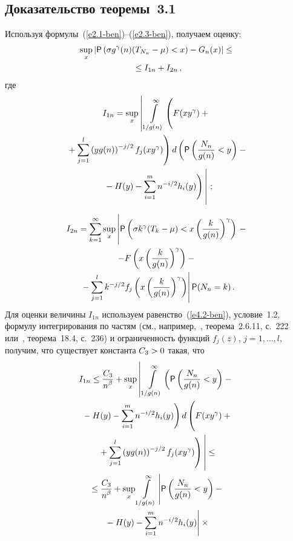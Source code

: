 \begin{multicols}{2}
\section{Доказательство теоремы~3.1}

Используя формулы~(\ref{e2.1-ben})--(\ref{e2.3-ben}),  получаем оценку:
\begin{multline}
\sup\limits_{x}\left| {\sf P}\left(\sigma g^\gamma(n)(T_{N_n}  -  \mu)  <
x\right) -  G_n(x)\right| \leq {}\\
{}\leq I_{1n} + I_{2n}\,, \label{e4.1-ben}
\end{multline}
где
\begin{multline}
I_{1n} =
 \sup\limits_{x}\left| \, \int\limits_{1/g(n)}^\infty \left(
 \vphantom{\sum\limits_{j=1}^l}
 F(x y^\gamma) +{}\right.\right.\\
\left. {}+
\sum\limits_{j=1}^l \left(yg(n)\right)^{-j/2}f_j(xy^\gamma)\right)  d
\left({\p}\left(\fr{N_n}{g(n)} < y\right) -{}\right.\\
\left.\left.{}- H(y) - \sum\limits_{i=1}^m
n^{-i/2} h_i(y)\right)
\vphantom{\int\limits_{1/g(n)}^\infty}\right|\,; \label{e4.2-ben}
\end{multline}

\vspace*{-12pt}

\noindent
\begin{multline}
I_{2n}  =  \sum\limits_{k=1}^{\infty} \sup\limits_{x}  \left|
\vphantom{\sum\limits_{j=1}^l}
 {\p}\left(\sigma
k^\gamma(T_{k}  -  \mu)  < x\left(\fr{k}{g(n)}\right)^\gamma\right)\right.
-{}
\\
- F\left(x \left(\fr{k}{g(n)}\right)^\gamma\right) - {}\\
\left.{}-\sum\limits_{j=1}^l
k^{-j/2}f_j\left(x\left(\fr{k}{g(n)}\right)^\gamma\right)\right|
{\p}(N_n=k)\,.    \label{e4.3-ben}
\end{multline}
Для оценки величины  $I_{1n}$ используем равенство~(\ref{e4.2-ben}),  
условие~1.2, формулу интегрирования по частям (см., например,~\cite{5-ben},
теорема~2.6.11, с.~222 или~\cite{15-ben}, теорема~18.4, с.~236) и
ограниченность функций $f_j(z)$, $j=1,\ldots ,l$, получим, что существует
константа $C_3\hm>0$ такая, что
\begin{multline*}
I_{1n} \le \fr{C_3}{n^\beta} + \sup\limits_{x}\left|\,
\int\limits_{1/g(n)}^\infty \left({\p}\left(\fr{N_n}{g(n)} <
y\right) -{}\right.\right.\\
\left.{}- H(y) - \sum\limits_{i=1}^m n^{-i/2} h_i(y)\right) 
d \left(\vphantom{\sum\limits_{j=1}^l}
F(x y^\gamma) + {} \right.\\
\left.\left.{}+\sum\limits_{j=1}^l
\left(yg(n)\right)^{-j/2}f_j(xy^\gamma)\right)
\vphantom{\int\limits_{1/g(n)}^\infty} \right| \le{}
\\
{}
\le \fr{C_3}{n^\beta} +   \sup\limits_{x}  \int\limits_{1/g(n)}^\infty
\left| \vphantom{\sum\limits_{j=1}^l}
{\p}\left(\fr{N_n}{g(n)} < y\right) -{}\right.\\
\left.{}- H(y) - \sum\limits_{i=1}^m
n^{-i/2} h_i(y)\right| \times{}
\end{multline*}


\end{multicols}
